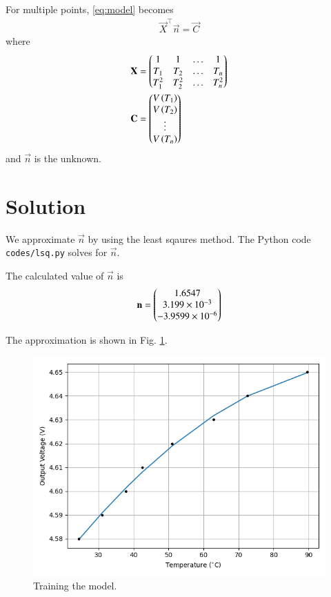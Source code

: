 \documentclass[journal,12pt,onecolumn]{IEEEtran}
\theoremstyle{remark}
\begin{document}
For multiple points, \eqref{eq:model} becomes
\begin{align}
    \vec{X}^\top\vec{n} = \vec{C}
    \label{eq:lsq-eqn}
\end{align}
where
\begin{align}
    \mathbf{X} &= \begin{pmatrix}1&1&\ldots&1\\T_1&T_2&\ldots&T_n\\T_1^2&T_2^2&\ldots&T_n^2\end{pmatrix} \\
    \mathbf{C} &= \begin{pmatrix}V\left(T_1\right)\\V\left(T_2\right)\\\vdots\\V\left(T_n\right)\end{pmatrix}
\end{align}
and $\vec{n}$ is the unknown.

\section{Solution}
We approximate $\vec{n}$ by using the least sqaures method. The Python code 
\texttt{codes/lsq.py} solves for $\vec{n}$.

The calculated value of $\vec{n}$ is
\begin{align}
    \mathbf{n} = \begin{pmatrix}1.6547\\3.199\times10^{-3}\\-3.9599\times10^{-6}\end{pmatrix}
    \label{eq:opt-theta}
\end{align}

The approximation is shown in Fig. \ref{fig:train}.
\begin{figure}[!ht]
    \centering
    \includegraphics[width=\columnwidth]{figs/train.png}
    \caption{Training the model.}
    \label{fig:train}
\end{figure}
\end{document}
